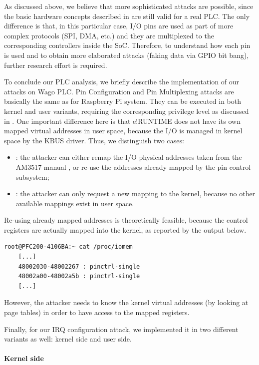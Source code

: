 As discussed above, we believe that more sophisticated attacks are possible, since the basic hardware concepts described in 
are still valid for a real PLC. The only difference is that, in this particular case, I/O pins are used as part of more complex protocols (SPI, DMA, etc.) and
they are multiplexed to the corresponding controllers inside the SoC. Therefore, to understand how each pin is used and to obtain more elaborated attacks
(\eg faking data via GPIO bit bang), further research effort is required.

To conclude our PLC analysis, we briefly describe the implementation of our attacks on Wago PLC.
Pin Configuration and Pin Multiplexing attacks are basically the same as for Raspberry Pi system. They can be executed in both kernel and user variants,
requiring the corresponding privilege level as discussed in .
One important difference here is that e!RUNTIME does not have its own mapped virtual addresses in user space, because the I/O is managed in kernel space
by the KBUS driver. Thus, we distinguish two cases:
\begin{itemize}
	\item {}: the attacker can either remap the I/O physical addresses taken from the AM3517 manual \cite{am35x},
	or re-use the addresses already mapped by the pin control subsystem;
	\item {}: the attacker can only request a new mapping to the kernel, because no other available mappings exist in user space.
\end{itemize}
Re-using already mapped addresses is theoretically feasible, because the control registers are actually mapped into the kernel, as reported by the output below.
\begin{Verbatim}[fontsize=\small]
	root@PFC200-4106BA:~ cat /proc/iomem 
	[...]
	48002030-48002267 : pinctrl-single
	48002a00-48002a5b : pinctrl-single
	[...]
\end{Verbatim}
However, the attacker needs to know the kernel virtual addresses (\eg by looking at page tables) in order to have access to the mapped registers.

Finally, for our IRQ configuration attack, we implemented it in two different variants as well: kernel side and user side.


\paragraph{Kernel side}

